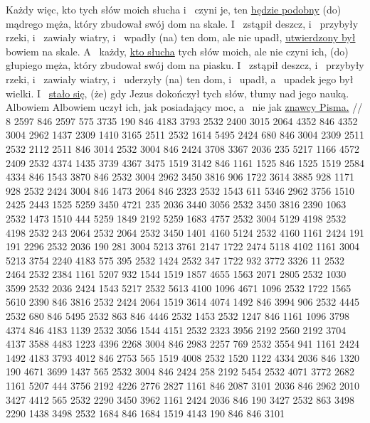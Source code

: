  Każdy więc, kto tych słów moich słucha i~ czyni je, ten \underline{będzie podobny} (do) mądrego męża, który zbudował swój dom na skale.
 I~ zstąpił deszcz, i~ przybyły rzeki, i~ zawiały wiatry, i~ wpadły (na) ten dom, ale nie upadł, \underline{utwierdzony był} bowiem na skale.
 A~ każdy, \underline{kto słucha} tych słów moich, ale nie czyni ich,  (do) głupiego męża, który zbudował swój dom na piasku.
 I~ zstąpił deszcz, i~ przybyły rzeki, i~ zawiały wiatry, i~ uderzyły (na) ten dom, i~ upadł, a~ upadek jego był wielki.
 I~ \underline{stało się,} (że) gdy Jezus dokończył tych słów,  tłumy nad jego nauką.
 Albowiem Albowiem uczył ich, jak posiadający moc, a~ nie jak \underline{znawcy Pisma.}
//
\endgl
\begingl
\lettrine[loversize=1,lraise=-1.3]{8 }{}%
 2597 846 2597 575 3735 190 846 4183 3793
{} 2532 2400 3015 2064 4352 846 4352 {} 3004 2962 1437 2309 1410 3165 2511
{} 2532 1614 5495 2424 680 846 3004 2309 2511 2532 2112 2511 846 3014
{} 2532 3004 846 2424 3708 3367 {} 2036 235 5217 1166 4572 2409 2532 4374 1435 3739 4367 3475 1519 3142 846
{} 1161 1525 846 1525 1519 2584 4334 846 1543 3870 846
{} 2532 3004 2962 3450 3816 906 1722 3614 3885 928 1171 928
{} 2532 2424 3004 846 1473 2064 {} 846 2323
{} 2532 1543 611 5346 2962 3756 1510 2425 {} 2443 1525 5259 3450 4721 235 2036 3440 3056 2532 3450 3816 2390
{} 1063 2532 1473 {} 1510 444 5259 1849 2192 5259 1683 4757 2532 3004 5129 4198 2532 4198 2532 243 2064 2532 2064 2532 3450 1401 4160 5124 2532 4160
{} 1161 2424 191 {} 191 2296 2532 2036 190 {} 281 3004 5213 3761 2147 1722 2474 5118 4102
{} 1161 3004 5213 3754 2240 4183 575 395 2532 1424 2532 347 {} 1722 932 3772 3326 11 2532 2464 2532 2384
{} 1161 5207 932 1544 1519 1857 4655 1563 2071 2805 2532 1030 3599
{} 2532 2036 2424 1543 5217 2532 5613 4100 {} 1096 4671 1096 2532 1722 1565 5610 2390 846 3816
{} 2532 2424 2064 1519 3614 4074 1492 846 3994 906 2532 4445
{} 2532 680 846 5495 2532 863 846 4446 2532 1453 2532 1247 846
{} 1161 {} 1096 3798 4374 846 4183 1139 2532 3056 1544 4151 2532 2323 3956 2192 2560 2192
{} 3704 4137 3588 4483 1223 4396 2268 3004 846 2983 2257 769 2532 3554 941
{} 1161 2424 1492 4183 3793 4012 846 2753 565 1519 4008
{} 2532 1520 {} 1122 4334 {} 2036 846 1320 190 4671 3699 1437 {} 565
{} 2532 3004 846 2424 258 2192 5454 2532 4071 3772 2682 1161 5207 444 3756 2192 4226 2776 2827
{} 1161 846 2087 3101 2036 846 2962 2010 3427 4412 565 2532 2290 3450 3962
{} 1161 2424 2036 846 190 3427 2532 863 3498 2290 1438 3498
{} 2532 1684 846 1684 1519 4143 190 846 846 3101
